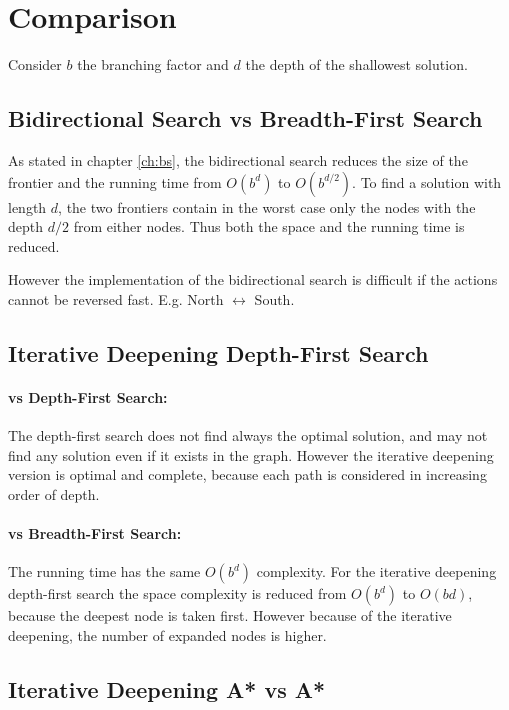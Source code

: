 \section{Comparison} 

Consider $b$ the branching factor and $d$ the depth of the shallowest solution.


\subsection{Bidirectional Search vs Breadth-First Search}

As stated in chapter \ref{ch:bs}, the bidirectional search reduces the size of the frontier and the running time from $O(b^d)$ to $O(b^{d/2})$. To find a solution with length $d$, the two frontiers contain in the worst case only the nodes with the depth $d/2$ from either nodes. Thus both the space and the running time is reduced. 

However the implementation of the bidirectional search is difficult if the actions cannot be reversed fast. E.g. North $\leftrightarrow$ South.


\subsection{Iterative Deepening Depth-First Search}

\paragraph{vs Depth-First Search:}

The depth-first search does not find always the optimal solution, and may not find any solution even if it exists in the graph. However the iterative deepening version is optimal and complete, because each path is considered in increasing order of depth.

\paragraph{vs Breadth-First Search:}

The running time has the same $O(b^d)$ complexity. For the iterative deepening depth-first search the space complexity is reduced from $O(b^d)$ to $O(bd)$, because the deepest node is taken first. However because of the iterative deepening, the number of expanded nodes is higher.


\subsection{Iterative Deepening A* vs A*}

